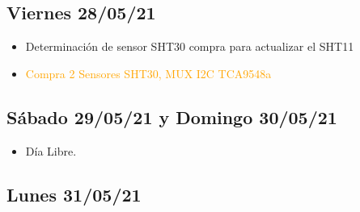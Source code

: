 \subsection*{Viernes 28/05/21}
\begin{itemize}
    \item Determinación de sensor SHT30 compra para actualizar el SHT11
    \item \textcolor{orange}{Compra 2 Sensores SHT30, MUX I2C TCA9548a}
\end{itemize}
\subsection*{Sábado 29/05/21 y Domingo 30/05/21}
    \begin{itemize}
        \item Día Libre.
    \end{itemize}

\subsection*{Lunes 31/05/21}

\clearpage